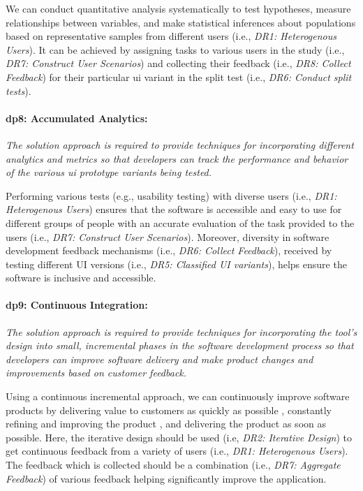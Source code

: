 We can conduct quantitative analysis systematically to test hypotheses, measure relationships between variables, and make statistical inferences about populations based on representative samples from different users (i.e., \textit{DR1: Heterogenous Users}).
It can be achieved by assigning tasks to various users in the study (i.e., \textit{DR7: Construct User Scenarios}) and collecting their feedback (i.e., \textit{DR8: Collect Feedback}) for their particular \ac{ui} variant in the split test (i.e., \textit{DR6: Conduct split tests}).

\paragraph{\ac{dp}8: Accumulated Analytics:} \textit{The solution approach is required to provide techniques for incorporating different analytics and metrics so that developers can track the performance and behavior of the various \ac{ui} prototype variants being tested.}

Performing various tests (e.g., usability testing) with diverse users (i.e., \textit{DR1: Heterogenous Users}) ensures that the software is accessible and easy to use for different groups of people with an accurate evaluation of the task provided to the users (i.e., \textit{DR7: Construct User Scenarios}).
Moreover, diversity in software development feedback mechanisms (i.e., \textit{DR6: Collect Feedback}), received by testing different UI versions (i.e., \textit{DR5: Classified UI variants}), helps ensure the software is inclusive and accessible.

\paragraph{\ac{dp}9: Continuous Integration:} \textit{The solution approach is required to provide techniques for incorporating the tool's design into small, incremental phases in the software development process so that developers can improve software delivery and make product changes and improvements based on customer feedback.}

Using a continuous incremental approach, we can continuously improve software products by delivering value to customers as quickly as possible \cite{misc:lean:toyota}, constantly refining and improving the product \cite{misc:lean:planning}, and delivering the product as soon as possible.
Here, the iterative design should be used (i.e, \textit{DR2: Iterative Design}) to get continuous feedback from a variety of users (i.e., \textit{DR1: Heterogenous Users}).
The feedback which is collected should be a combination (i.e., \textit{DR7: Aggregate Feedback}) of various feedback helping significantly improve the application.

